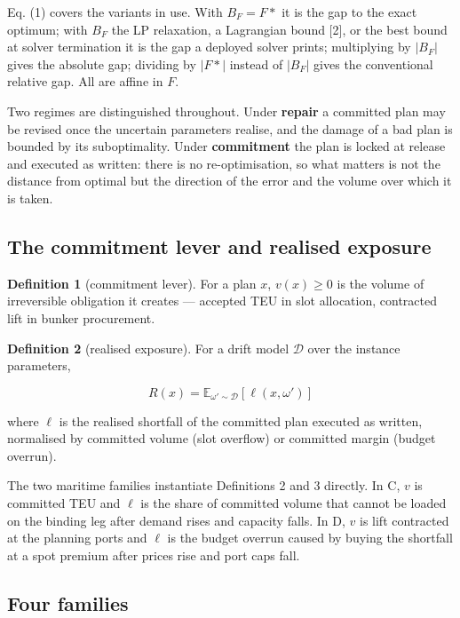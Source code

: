 \documentclass[preprint,12pt,letterpaper]{elsarticle}
\theoremstyle{definition}
\newtheorem{definition}{Definition}
\theoremstyle{plain}
\begin{document}
Eq. (1) covers the variants in use. With $B_{F} = F*$ it is the gap to the exact optimum; with $B_{F}$ the LP relaxation, a Lagrangian bound [2], or the best bound at solver termination it is the gap a deployed solver prints; multiplying by $|B_{F}|$ gives the absolute gap; dividing by $|F*|$ instead of $|B_{F}|$ gives the conventional relative gap. All are affine in $F$.

Two regimes are distinguished throughout. Under \textbf{repair} a committed plan may be revised once the uncertain parameters realise, and the damage of a bad plan is bounded by its suboptimality. Under \textbf{commitment} the plan is locked at release and executed as written: there is no re-optimisation, so what matters is not the distance from optimal but the direction of the error and the volume over which it is taken.

\subsection{The commitment lever and realised exposure}

\begin{definition}[commitment lever]
For a plan $x$, $v(x) \ge 0$ is the volume of irreversible obligation it creates --- accepted TEU in slot allocation, contracted lift in bunker procurement.
\end{definition}

\begin{definition}[realised exposure]
For a drift model $\mathcal{D}$ over the instance parameters,

\begin{equation}
\tag{2}
R(x) = \mathbb{E}_{\omega'\sim \mathcal{D}}[ \ell(x, \omega') ]
\end{equation}

where $\ell$ is the realised shortfall of the committed plan executed as written, normalised by committed volume (slot overflow) or committed margin (budget overrun).
\end{definition}

The two maritime families instantiate Definitions 2 and 3 directly. In C, $v$ is committed TEU and $\ell$ is the share of committed volume that cannot be loaded on the binding leg after demand rises and capacity falls. In D, $v$ is lift contracted at the planning ports and $\ell$ is the budget overrun caused by buying the shortfall at a spot premium after prices rise and port caps fall.

\subsection{Four families}
\end{document}
